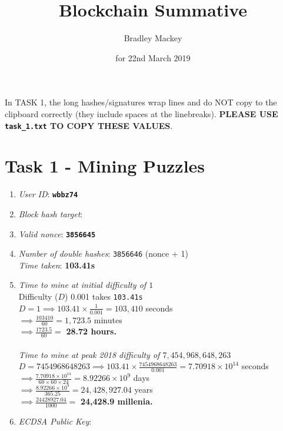\documentclass[11pt]{article}
\begin{document}
\title{\textbf{Blockchain Summative}}
\date{for 22nd March 2019}
\author{Bradley Mackey}
\maketitle

In TASK 1, the long hashes/signatures wrap lines and do NOT copy to the clipboard correctly (they include spaces at the linebreaks). \textbf{PLEASE USE \texttt{task\_1.txt} TO COPY THESE VALUES}.

\section*{Task 1 - Mining Puzzles}

\begin{enumerate}
\item \textit{User ID}: \textbf{\texttt{wbbz74}}
\item \textit{Block hash target}: \texttt{}
\item \textit{Valid nonce}: \textbf{\texttt{3856645}}
\item \textit{Number of double hashes}: \texttt{3856646} (nonce + 1)\\
\textit{Time taken}: \textbf{103.41s}
\item 
\textit{Time to mine at initial difficulty of $1$}\\
Difficulty ($D$) 0.001 takes \texttt{103.41s}\\
$D=1 \implies 103.41\times{\frac{1}{0.001}}=103,410$ seconds\\
$\implies \frac{103410}{60}=1,723.5$ minutes\\
$\implies \frac{1723.5}{60}=$ \textbf{28.72 hours.}\\
\\
\textit{Time to mine at peak 2018 difficulty of $7,454,968,648,263$}\\
$D=7454968648263 \implies 103.41\times{\frac{7454968648263}{0.001}}=7.70918\times10^{14}$ seconds\\
$\implies \frac{7.70918\times10^{14}}{60\times60\times24}=8.92266\times10^{9}$ days\\
$\implies \frac{8.92266\times10^{9}}{365.25}=24,428,927.04$ years\\
$\implies \frac{24428927.04}{1000}=$ \textbf{24,428.9 millenia.}\\

\item \textit{ECDSA Public Key}: \texttt{}


\end{enumerate}
\end{document}

